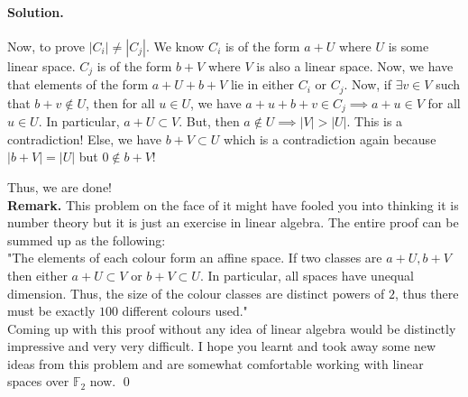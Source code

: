 \documentclass[12pt]{article}
\newenvironment{solution}
{\paragraph{Solution.}}
{\qed\eject}
\newcommand*{\FF}{\mathbb{F}}
\begin{document}
\begin{solution}
    Now, to prove $|C_i|\ne |C_j|$. We know $C_i$ is of the form $a+U$ where $U$ is some linear space. $C_j$ is of the form $b+V$ where $V$ is also a linear space. Now, we have that elements of the form $a+U+b+V$ lie in either $C_i$ or $C_j$. Now, if $\exists v\in V$ such that $b+v\not\in U$, then for all $u\in U$, we have $a+u+b+v\in C_j\implies a+u\in V$ for all $u\in U$. In particular, $a+U\subset V$. But, then $a\not\in U\implies |V|>|U|$. This is a contradiction! Else, we have $b+V\subset U$ which is a contradiction again because $|b+V|=|U|$ but $0\not\in b+V$!
    
    Thus, we are done!\\

    \textbf{Remark.} This problem on the face of it might have fooled you into thinking it is number theory but it is just an exercise in linear algebra. The entire proof can be summed up as the following:\\

    "The elements of each colour form an affine space. If two classes are $a+U, b+V$ then either $a+U\subset V$ or $b+V\subset U$. In particular, all spaces have unequal dimension. Thus, the size of the colour classes are distinct powers of $2$, thus there must be exactly $100$ different colours used."\\
    
    Coming up with this proof without any idea of linear algebra would be distinctly impressive and very very difficult. I hope you learnt and took away some new ideas from this problem and are somewhat comfortable working with linear spaces over $\FF_2$ now.
\end{solution}
\end{document}
